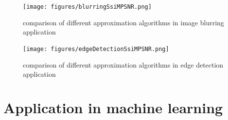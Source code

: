 \documentclass[]{IEEEtran}
\begin{document}
\begin{figure}[h]
	\centering
	\texttt{[image: figures/blurringSsiMPSNR.png]}
	\caption{comparison of different approximation algorithms in image blurring application}
	\label{fig:blurrSSIMPSNRComp}
\end{figure}

\begin{figure}[h]
	\centering
	\texttt{[image: figures/edgeDetectionSsiMPSNR.png]}
	\caption{comparison of different approximation algorithms in edge detection application}
	\label{fig:edgeSSIMPSNRComp}
\end{figure}

\newpage

\section{Application in machine learning}
\label{ch:APPML}
\end{document}
